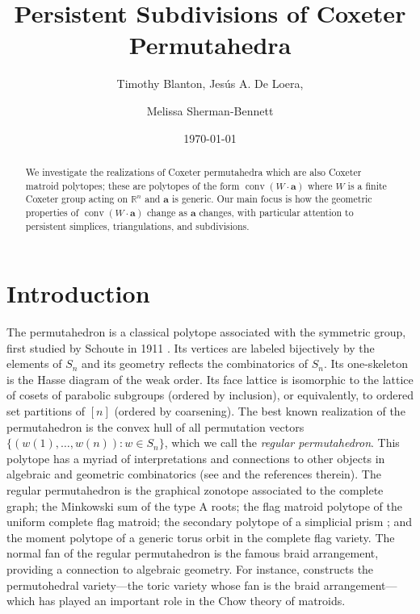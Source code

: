 \documentclass{amsart}
\title{Persistent Subdivisions of Coxeter Permutahedra}
\author[T. Blanton, J. De Loera, M. Sherman-Bennett]{Timothy Blanton, Jes\'us A. De Loera, \and Melissa Sherman-Bennett}
\date{\today}
\theoremstyle{definition}
\def\ba{\mathbf{a}}
\DeclareMathOperator{\conv}{conv}
\begin{document}
\maketitle




\begin{abstract}
    We investigate the realizations of Coxeter permutahedra which are also Coxeter matroid polytopes; these are polytopes of the form $\conv(W \cdot \ba)$ where $W$ is a finite Coxeter group acting on $\mathbb{R}^n$ and $\ba$ is generic. Our main focus is how the geometric properties of $\conv(W \cdot \ba)$ change as $\ba$ changes, with particular attention to persistent simplices, triangulations, and subdivisions.
\end{abstract}



\section{Introduction}

The permutahedron is a classical polytope associated with the symmetric group, first studied by Schoute in 1911 \cite{Schoute1911}. Its vertices are labeled bijectively by the elements of $S_n$ and its geometry reflects the combinatorics of $S_n$. Its one-skeleton is the Hasse diagram of the weak order. Its face lattice is isomorphic to the lattice of cosets of parabolic subgroups (ordered by inclusion), or equivalently, to ordered set partitions of $[n]$ (ordered by coarsening).  The best known realization of the permutahedron is the convex hull of all permutation vectors $\{(w(1), \dots, w(n)): w \in S_n\}$, which we call the \emph{regular permutahedron}. This polytope has a myriad of interpretations and connections to other objects in algebraic and geometric combinatorics (see \cite{BjornerBrenti05,Humphreys90,HolwegLangeThomas2011,Post09,Pons2023} and the references therein). The regular permutahedron is the graphical zonotope associated to the complete graph; the Minkowski sum of the type A roots; the flag matroid polytope of the uniform complete flag matroid; the secondary polytope of a simplicial prism \cite{DLRS10}; and the moment polytope of a generic torus orbit in the complete flag variety.
The normal fan of the regular permutahedron is the famous braid arrangement, providing a connection to algebraic geometry. For instance, \cite{DeConciniProcesi1995} constructs the permutohedral variety---the toric variety whose fan is the braid arrangement---which has played an important role in the Chow theory of matroids.
\end{document}
